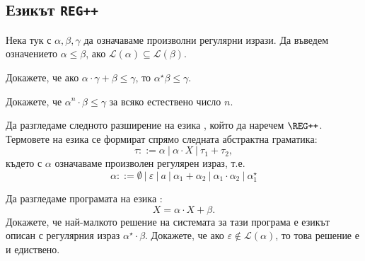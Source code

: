 
\subsection{Езикът \texttt{REG++}}

Нека тук с $\alpha,\beta,\gamma$ да означаваме произволни регулярни изрази.
Да въведем означението $\alpha \leq \beta$, ако $\mathcal{L}(\alpha) \subseteq \mathcal{L}(\beta)$.

\begin{problem}
  Докажете, че ако $\alpha \cdot \gamma + \beta \leq \gamma$, то $\alpha^\star \beta \leq \gamma$.
\end{problem}
\begin{hint}
  Докажете, че $\alpha^n \cdot \beta \leq \gamma$ за всяко естествено число $n$.
\end{hint}

Да разгледаме следното разширение на езика \REG, който да наречем $\REG\texttt{++}$.
Термовете на езика \REGPP се формират спрямо следната абстрактна граматика:
\[\tau ::= \alpha\ |\ \alpha \cdot X\ |\ \tau_1 + \tau_2,\]
където с $\alpha$ означаваме произволен регулярен израз, т.е.
\[\alpha ::= \emptyset\ |\ \varepsilon\ |\ a\ |\ \alpha_1 + \alpha_2\ |\ \alpha_1 \cdot \alpha_2\ |\ \alpha^\star_1\]

\begin{problem}\label{prob:reg:arden}
  Да разгледаме програмата на езика \REGPP:
  \[X = \alpha \cdot X + \beta.\]
  Докажете, че най-малкото решение на системата за тази програма е езикът описан с регулярния израз $\alpha^\star \cdot \beta$. Докажете, че ако $\varepsilon \not \in \mathcal{L}(\alpha)$, то това решение е и едиствено.
\end{problem}

